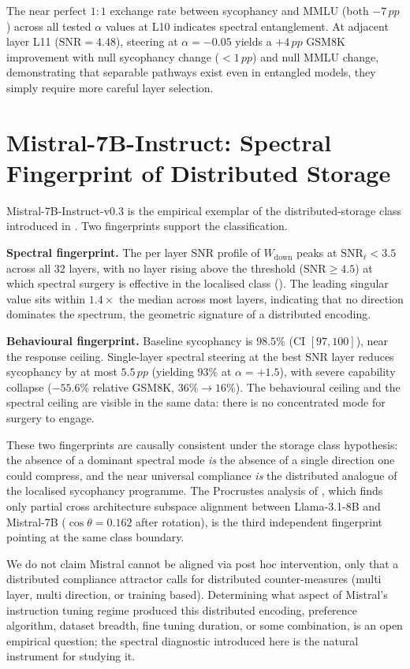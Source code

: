 \documentclass{article}
\newcommand{\snr}{\mathrm{SNR}}
\newcommand{\pp}{\,pp}
\begin{document}
The near perfect $1:1$ exchange rate between sycophancy and MMLU
(both $-7\pp$) across all tested $\alpha$ values at L10 indicates
spectral entanglement. At adjacent layer L11 ($\snr{=}4.48$), steering
at $\alpha=-0.05$ yields a $+4\pp$ GSM8K improvement with null
sycophancy change ($<1\pp$) and null MMLU change, demonstrating that
separable pathways exist even in entangled models, they simply
require more careful layer selection.

\section{Mistral-7B-Instruct: Spectral Fingerprint of Distributed Storage}
\label{app:mistral}

Mistral-7B-Instruct-v0.3 is the empirical exemplar of the
distributed-storage class introduced in . Two
fingerprints support the classification.

\textbf{Spectral fingerprint.} The per layer SNR profile of
$W_\mathrm{down}$ peaks at $\snr_\ell < 3.5$ across all 32 layers,
with no layer rising above the threshold ($\snr \ge 4.5$) at which
spectral surgery is effective in the localised class
(). The leading singular value sits within
$1.4\times$ the median across most layers, indicating that no
direction dominates the spectrum, the geometric signature of a
distributed encoding.

\textbf{Behavioural fingerprint.} Baseline sycophancy is $98.5\%$
(CI $[97,100]$), near the response ceiling. Single-layer spectral
steering at the best SNR layer reduces sycophancy by at most
$5.5\pp$ (yielding $93\%$ at $\alpha{=}{+}1.5$), with severe capability
collapse ($-55.6\%$ relative GSM8K, $36\%\!\to\!16\%$). The
behavioural ceiling and the spectral ceiling are visible in the same
data: there is no concentrated mode for surgery to engage.

These two fingerprints are causally consistent under the
storage class hypothesis: the absence of a dominant spectral mode
\emph{is} the absence of a single direction one could compress, and
the near universal compliance \emph{is} the distributed analogue of
the localised sycophancy programme. The Procrustes analysis of
, which finds only partial cross architecture
subspace alignment between Llama-3.1-8B and Mistral-7B
($\cos\theta = 0.162$ after rotation), is the third independent
fingerprint pointing at the same class boundary.

We do not claim Mistral cannot be aligned via post hoc intervention,
only that a distributed compliance attractor calls for distributed
counter-measures (multi layer, multi direction, or training based).
Determining what aspect of Mistral's instruction tuning regime
produced this distributed encoding, preference algorithm, dataset
breadth, fine tuning duration, or some combination, is an open
empirical question; the spectral diagnostic introduced here is the
natural instrument for studying it.
\end{document}
